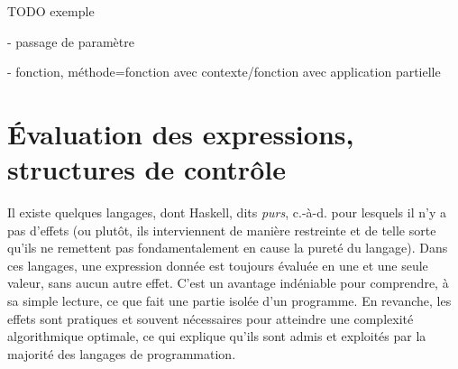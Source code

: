 \documentclass[a4paper,francais]{insalyon}
\newcommand{\cad}{c.-à-d.}
\begin{document}


TODO exemple

- passage de paramètre

- fonction, méthode=fonction avec contexte/fonction avec application partielle



\section{\'Evaluation des expressions, structures de contrôle}







Il existe quelques langages, dont Haskell, dits \emph{purs}, {\cad} pour lesquels il n'y a pas d'effets (ou plutôt, ils interviennent de manière restreinte et de telle sorte qu'ils ne remettent pas fondamentalement en cause la pureté du langage). Dans ces langages, une expression donnée est toujours évaluée en une et une seule valeur, sans aucun autre effet. C'est un avantage indéniable pour comprendre, à sa simple lecture, ce que fait une partie isolée d'un programme. En revanche, les effets sont pratiques et souvent nécessaires pour atteindre une complexité algorithmique optimale, ce qui explique qu'ils sont admis et exploités par la majorité des langages de programmation.    
\end{document}
